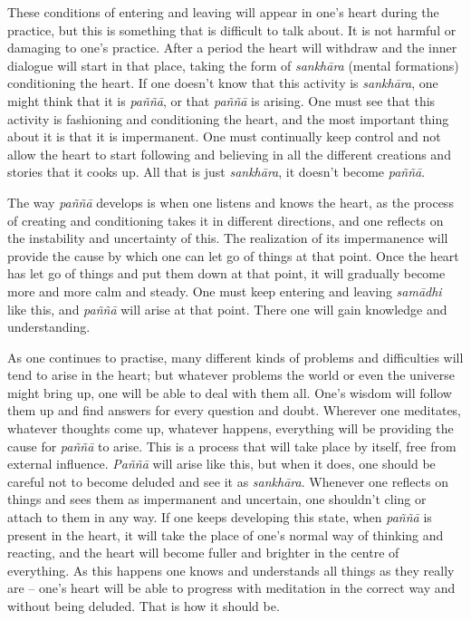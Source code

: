 These conditions of entering and leaving will appear in one's heart
during the practice, but this is something that is difficult to talk
about. It is not harmful or damaging to one's practice. After a period
the heart will withdraw and the inner dialogue will start in that place, 
taking the form of \emph{sankhāra} (mental formations) conditioning the
heart. If one doesn't know that this activity is \emph{sankhāra}, one
might think that it is \emph{paññā}, or that \emph{paññā} is arising. 
One must see that this activity is fashioning and conditioning the
heart, and the most important thing about it is that it is impermanent. 
One must continually keep control and not allow the heart to start
following and believing in all the different creations and stories that
it cooks up. All that is just \emph{sankhāra}, it doesn't become
\emph{paññā}. 

The way \emph{paññā} develops is when one listens and knows the heart, 
as the process of creating and conditioning takes it in different
directions, and one reflects on the instability and uncertainty of this. 
The realization of its impermanence will provide the cause by which one
can let go of things at that point. Once the heart has let go of things
and put them down at that point, it will gradually become more and more
calm and steady. One must keep entering and leaving \emph{samādhi} like
this, and \emph{paññā} will arise at that point. There one will gain
knowledge and understanding. 

As one continues to practise, many different kinds of problems and
difficulties will tend to arise in the heart; but whatever problems the
world or even the universe might bring up, one will be able to deal with
them all. One's wisdom will follow them up and find answers for every
question and doubt. Wherever one meditates, whatever thoughts come up, 
whatever happens, everything will be providing the cause for
\emph{paññā} to arise. This is a process that will take place by itself, 
free from external influence. \emph{Paññā} will arise like this, but
when it does, one should be careful not to become deluded and see it as
\emph{sankhāra}. Whenever one reflects on things and sees them as
impermanent and uncertain, one shouldn't cling or attach to them in any
way. If one keeps developing this state, when \emph{paññā} is present in
the heart, it will take the place of one's normal way of thinking and
reacting, and the heart will become fuller and brighter in the centre of
everything. As this happens one knows and understands all things as they
really are -- one's heart will be able to progress with meditation in
the correct way and without being deluded. That is how it should be. 

